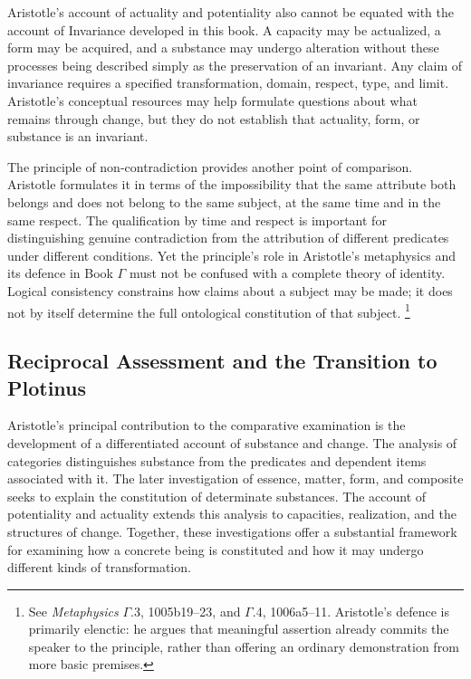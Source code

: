 \label{para:VS.B01.P01.C08.S05.SS09.P004}

Aristotle's account of actuality and potentiality
also cannot be equated with the account of
Invariance developed in this book. A capacity
may be actualized, a form may be acquired,
and a substance may undergo alteration without
these processes being described simply as
the preservation of an invariant. Any claim
of invariance requires a specified transformation,
domain, respect, type, and limit. Aristotle's
conceptual resources may help formulate questions
about what remains through change, but they
do not establish that actuality, form, or
substance is an invariant.

\label{para:VS.B01.P01.C08.S05.SS09.P005}

The principle of non-contradiction provides
another point of comparison. Aristotle formulates
it in terms of the impossibility that the same
attribute both belongs and does not belong to
the same subject, at the same time and in
the same respect. The qualification by time
and respect is important for distinguishing
genuine contradiction from the attribution
of different predicates under different conditions.
Yet the principle's role in Aristotle's
metaphysics and its defence in Book $\Gamma$
must not be confused with a complete theory
of identity. Logical consistency constrains
how claims about a subject may be made; it
does not by itself determine the full ontological
constitution of that subject. \footnote{See
\textit{Metaphysics} $\Gamma$.3, 1005b19--23,
and $\Gamma$.4, 1006a5--11. Aristotle's defence
is primarily elenctic: he argues that meaningful
assertion already commits the speaker to the
principle, rather than offering an ordinary
demonstration from more basic premises.}


\subsection{Reciprocal Assessment and the Transition to Plotinus}

\label{para:VS.B01.P01.C08.S05.SS10.P001}

Aristotle's principal contribution to the comparative
examination is the development of a differentiated
account of substance and change. The analysis of
categories distinguishes substance from the
predicates and dependent items associated with
it. The later investigation of essence, matter,
form, and composite seeks to explain the constitution
of determinate substances. The account of
potentiality and actuality extends this analysis
to capacities, realization, and the structures
of change. Together, these investigations offer
a substantial framework for examining how
a concrete being is constituted and how it
may undergo different kinds of transformation.

